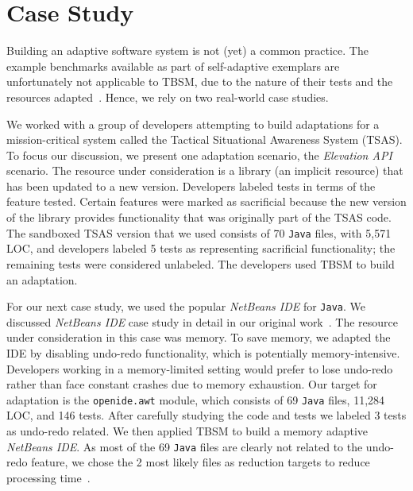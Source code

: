 \section{Case Study}
Building an adaptive software system is not (yet) a common practice. The example benchmarks available as part of self-adaptive exemplars are unfortunately not applicable to TBSM, due to the nature of their tests and the resources adapted~\cite{exemplars}. Hence, we rely on two real-world case studies.   

We worked with a group of developers attempting to build adaptations for a mission-critical system called the Tactical Situational Awareness System (TSAS). To focus our discussion, we present one adaptation scenario, the \textit{Elevation API} scenario. The resource under consideration is a library (an implicit resource) that has been updated to a new version. Developers labeled tests in terms of the feature tested. Certain features were marked as sacrificial because the new version of the library provides functionality that was originally part of the TSAS code. The sandboxed TSAS version that we used consists of 70 \texttt{Java} files, with 5,571 LOC, and developers labeled 5 tests as representing sacrificial functionality; the remaining tests were considered unlabeled. The developers used TBSM to build an adaptation.

For our next case study, we used the popular \textit{NetBeans IDE} for \texttt{Java}. We discussed \textit{NetBeans IDE} case study in detail in our original work~\cite{christi2017saso}. The resource under consideration in this case was memory. To save memory, we adapted the IDE by disabling undo-redo functionality, which is potentially memory-intensive. Developers working in a memory-limited setting would prefer to lose undo-redo rather than face constant crashes due to memory exhaustion. Our target for adaptation is the \texttt{openide.awt} module, which consists of 69 \texttt{Java} files, 11,284 LOC, and 146 tests. After carefully studying the code and tests we labeled 3 tests as undo-redo related. We then applied TBSM to build a memory adaptive \textit{NetBeans IDE}. As most of the 69 \texttt{Java} files are clearly not related to the undo-redo feature, we chose the 2 most likely files as reduction targets to reduce processing time~\cite{christi2017saso}. 
